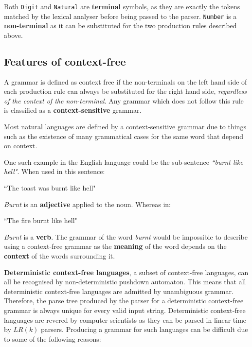\pagebreak

Both \verb|Digit| and \verb|Natural| are \textbf{terminal} symbols, as they are exactly the tokens matched by the lexical analyser before being passed to the parser. \verb|Number| is a \textbf{non-terminal} as it can be substituted for the two production rules described above.

\subsection{Features of context-free}
\label{sec:features-context-free}

A grammar is defined as context free if the non-terminals on the left hand side of each production rule can always be substituted for the right hand side, \textit{regardless of the context of the non-terminal}. Any grammar which does not follow this rule is classified as a \textbf{context-sensitive} grammar.

Most natural languages are defined by a context-sensitive grammar due to things such as the existence of many grammatical cases for the same word that depend on context.

One such example in the English language could be the sub-sentence \textit{``burnt like hell"}. When used in this sentence:

\begin{center}
    ``The toast was burnt like hell"
\end{center}

\textit{Burnt} is an \textbf{adjective} applied to the noun. Whereas in:

\begin{center}
    ``The fire burnt like hell"
\end{center}

\textit{Burnt} is a \textbf{verb}. The grammar of the word \textit{burnt} would be impossible to describe using a context-free grammar as the \textbf{meaning} of the word depends on the \textbf{context} of the words surrounding it.\textsuperscript{\cite{longley_2016}}

\textbf{Deterministic context-free languages}, a subset of context-free languages, can all be recognised by non-deterministic pushdown automaton. This means that all deterministic context-free languages are admitted by unambiguous grammar\textsuperscript{\cite{rosenkrantz_stearns_1970}}. Therefore, the parse tree produced by the parser for a deterministic context-free grammar is always unique for every valid input string. Deterministic context-free languages are revered by computer scientists as they can be parsed in linear time by $LR(k)$ parsers. Producing a grammar for such languages can be difficult due to some of the following reasons:

